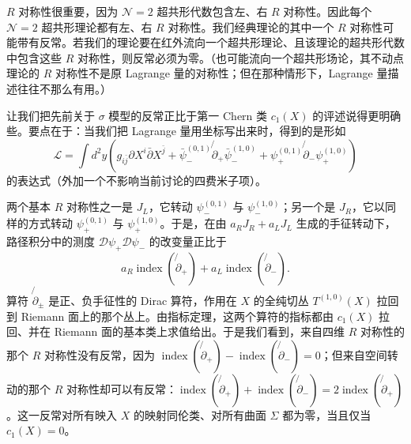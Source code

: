 $R$ 对称性很重要，因为 $\mathcal{N}=2$ 超共形代数包含左、右 $R$ 对称性。因此每个 $\mathcal{N}=2$ 超共形理论都有左、右 $R$ 对称性。我们经典理论的其中一个 $R$ 对称性可能带有反常。若我们的理论要在红外流向一个超共形理论、且该理论的超共形代数中包含这些 $R$ 对称性，则反常必须为零。（也可能流向一个超共形场论，其不动点理论的 $R$ 对称性不是原 Lagrange 量的对称性；但在那种情形下，Lagrange 量描述往往不那么有用。）

让我们把先前关于 $\sigma$ 模型的反常正比于第一 Chern 类 $c_1(X)$ 的评述说得更明确些。要点在于：当我们把 Lagrange 量用坐标写出来时，得到的是形如
\[
\mathcal{L}=\int d^2y\left(g_{i\bar j}\partial X^i\bar\partial X^{\bar j}+\bar\psi^{(0,1)}_-\not{\partial}_+\bar\psi^{(1,0)}_-+\psi^{(0,1)}_+\not{\partial}_-\psi^{(1,0)}_+\right)
\]
的表达式（外加一个不影响当前讨论的四费米子项）。


两个基本 $R$ 对称性之一是 $J_L$，它转动 $\psi^{(0,1)}_-$ 与 $\psi^{(1,0)}_-$；另一个是 $J_R$，它以同样的方式转动 $\psi^{(0,1)}_+$ 与 $\psi^{(1,0)}_+$。于是，在由 $a_RJ_R+a_LJ_L$ 生成的手征转动下，路径积分中的测度 $\mathcal{D}\psi_+\mathcal{D}\psi_-$ 的改变量正比于
\[
a_R\operatorname{index}(\not{\partial}_+)+a_L\operatorname{index}(\not{\partial}_-).
\]
算符 $\not{\partial}_\pm$ 是正、负手征性的 Dirac 算符，作用在 $X$ 的全纯切丛 $T^{(1,0)}(X)$ 拉回到 Riemann 面上的那个丛上。由指标定理，这两个算符的指标都由 $c_1(X)$ 拉回、并在 Riemann 面的基本类上求值给出。于是我们看到，来自四维 $R$ 对称性的那个 $R$ 对称性没有反常，因为 $\operatorname{index}(\not{\partial}_+)-\operatorname{index}(\not{\partial}_-)=0$；但来自空间转动的那个 $R$ 对称性却可以有反常：$\operatorname{index}(\not{\partial}_+)+\operatorname{index}(\not{\partial}_-)=2\operatorname{index}(\not{\partial}_+)$。这一反常对所有映入 $X$ 的映射同伦类、对所有曲面 $\Sigma$ 都为零，当且仅当 $c_1(X)=0$。

